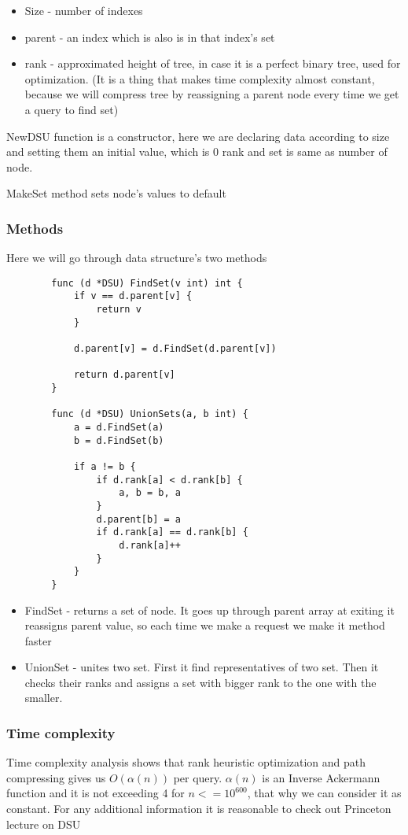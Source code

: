 		
		\begin{itemize}
			\item Size - number of indexes
			\item parent - an index which is also is in that index's set
			\item rank - approximated height of tree, in case it is a perfect binary tree, used for optimization. (It is a thing that makes time complexity almost constant, because we will compress tree by reassigning a parent node every time we get a query to find set)
		\end{itemize}
		
		NewDSU function is a constructor, here we are declaring data according to size and setting them an initial value, which is 0 rank and set is same as number of node.
		
		MakeSet method sets node's values to default
		
		\subsubsection{Methods}
		Here we will go through data structure's two methods
		\begin{lstlisting}
		func (d *DSU) FindSet(v int) int {
			if v == d.parent[v] {
				return v
			}

			d.parent[v] = d.FindSet(d.parent[v])

			return d.parent[v]
		}

		func (d *DSU) UnionSets(a, b int) {
			a = d.FindSet(a)
			b = d.FindSet(b)

			if a != b {
				if d.rank[a] < d.rank[b] {
					a, b = b, a
				}
				d.parent[b] = a
				if d.rank[a] == d.rank[b] {
					d.rank[a]++
				}
			}
		}
		\end{lstlisting}
		\begin{itemize}
			\item FindSet - returns a set of node. It goes up through parent array at exiting it reassigns parent value, so each time we make a request we make it method faster
			\item UnionSet - unites two set. First it find representatives of two set. Then it checks their ranks and assigns a set with bigger rank to the one with the smaller. 
		\end{itemize}
		
		\subsubsection{Time complexity}
		Time complexity analysis shows that rank heuristic optimization and path compressing gives us $O(\alpha{}(n))$ per query. $\alpha(n)$ is an Inverse Ackermann function and it is not exceeding 4 for $n<=10^{600}$, that why we can consider it as constant. For any additional information it is reasonable to check out Princeton lecture on DSU \cite{Union-Find}
		
